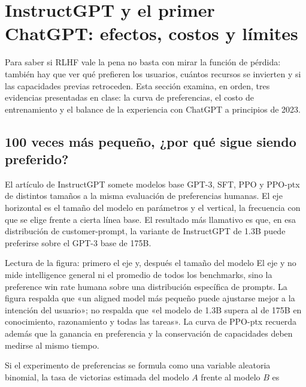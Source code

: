 \section{InstructGPT y el primer ChatGPT: efectos, costos y límites}

Para saber si RLHF vale la pena no basta con mirar la función de pérdida: también hay que ver qué prefieren los usuarios, cuántos recursos se invierten y si las capacidades previas retroceden. Esta sección examina, en orden, tres evidencias presentadas en clase: la curva de preferencias, el costo de entrenamiento y el balance de la experiencia con ChatGPT a principios de 2023.

\subsection{100 veces más pequeño, ¿por qué sigue siendo preferido?}

El artículo de InstructGPT somete modelos base GPT-3, SFT, PPO y PPO-ptx de distintos tamaños a la misma evaluación de preferencias humanas. El eje horizontal es el tamaño del modelo en parámetros y el vertical, la frecuencia con que se elige frente a cierta línea base. El resultado más llamativo es que, en esa distribución de customer-prompt, la variante de InstructGPT de 1.3B puede preferirse sobre el GPT-3 base de 175B.


\begin{knowledgebox}{Lectura de la figura: primero el eje y, después el tamaño del modelo}
El eje y no mide intelligence general ni el promedio de todos los benchmarks, sino la preference win rate humana sobre una distribución específica de prompts. La figura respalda que «un aligned model más pequeño puede ajustarse mejor a la intención del usuario»; no respalda que «el modelo de 1.3B supera al de 175B en conocimiento, razonamiento y todas las tareas». La curva de PPO-ptx recuerda además que la ganancia en preferencia y la conservación de capacidades deben medirse al mismo tiempo.
\end{knowledgebox}

Si el experimento de preferencias se formula como una variable aleatoria binomial, la tasa de victorias estimada del modelo $A$ frente al modelo $B$ es

